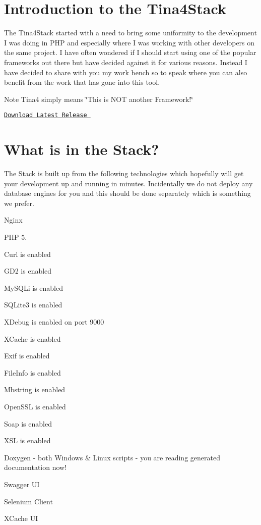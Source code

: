 \hypertarget{index_introduction}{}\section{Introduction to the Tina4\+Stack}\label{index_introduction}
The Tina4\+Stack started with a need to bring some uniformity to the development I was doing in P\+H\+P and especially where I was working with other developers on the same project. I have often wondered if I should start using one of the popular frameworks out there but have decided against it for various reasons. Instead I have decided to share with you my work bench so to speak where you can also benefit from the work that has gone into this tool.

\begin{DoxyNote}{Note}
Tina4 simply means \char`\"{}\+This is N\+O\+T another Framework!\char`\"{}
\end{DoxyNote}
 \href{https://sourceforge.net/projects/tina4stack/files/latest/download}{\tt Download Latest Release }\hypertarget{index_what_is_in_the_stack}{}\section{What is in the Stack?}\label{index_what_is_in_the_stack}
The Stack is built up from the following technologies which hopefully will get your development up and running in minutes. Incidentally we do not deploy any database engines for you and this should be done separately which is something we prefer.


\begin{DoxyItemize}
\item Nginx 
\item P\+H\+P 5. 
\begin{DoxyEnumerate}
\item Curl is enabled 
\item G\+D2 is enabled 
\item My\+S\+Q\+Li is enabled 
\item S\+Q\+Lite3 is enabled 
\item X\+Debug is enabled on port 9000 
\item X\+Cache is enabled 
\item Exif is enabled 
\item File\+Info is enabled 
\item Mbstring is enabled 
\item Open\+S\+S\+L is enabled 
\item Soap is enabled 
\item X\+S\+L is enabled 
\end{DoxyEnumerate}
\item Doxygen -\/ both Windows \& Linux scripts -\/ you are reading generated documentation now! 
\item Swagger U\+I 
\item Selenium Client 
\item X\+Cache U\+I 
\end{DoxyItemize}

